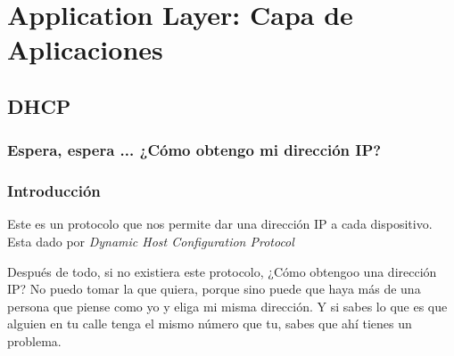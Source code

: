 \documentclass[12pt, fleqn]{report}                             %
\theoremstyle{break}                                            %
\begin{document}
                







\part{Application Layer: Capa de Aplicaciones}
\clearpage


    \chapter{DHCP}
    \section*{Espera, espera ... ¿Cómo obtengo mi dirección IP?}


        \clearpage
        \section{Introducción}

            Este es un protocolo que nos permite dar una dirección IP a cada dispositivo.
            Esta dado por \emph{Dynamic Host Configuration Protocol}

            Después de todo, si no existiera este protocolo, ¿Cómo obtengoo una dirección IP?
            No puedo tomar la que quiera, porque sino puede que haya más de una persona que piense
            como yo y eliga mi misma dirección.
            Y si sabes lo que es que alguien en tu calle tenga el mismo número que tu, sabes que 
            ahí tienes un problema.


\end{document}
